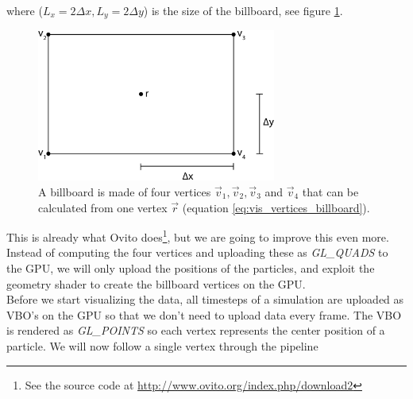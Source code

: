 where ($L_x = 2\Delta x, L_y = 2\Delta y$) is the size of the billboard, see figure \ref{fig:visualization_billboard_vertices}.
\begin{figure}[h]
\begin{center}
\includegraphics[width=0.7\textwidth, trim=0cm 0cm 0cm 0cm, clip]{visualization/figures/billboard.eps}
\end{center}
\caption{A billboard is made of four vertices $\vec v_1, \vec v_2, \vec v_3$ and $\vec v_4$ that can be calculated from one vertex $\vec r$ (equation \eqref{eq:vis_vertices_billboard}).}
\label{fig:visualization_billboard_vertices}
\end{figure}
This is already what Ovito does\footnote{See the source code at \url{http://www.ovito.org/index.php/download2}}, but we are going to improve this even more. Instead of computing the four vertices and uploading these as \textit{GL\_QUADS} to the GPU, we will only upload the positions of the particles, and exploit the geometry shader to create the billboard vertices on the GPU.\\
Before we start visualizing the data, all timesteps of a simulation are uploaded as VBO's on the GPU so that we don't need to upload data every frame. The VBO is rendered as \textit{GL\_POINTS} so each vertex represents the center position of a particle. We will now follow a single vertex through the pipeline
